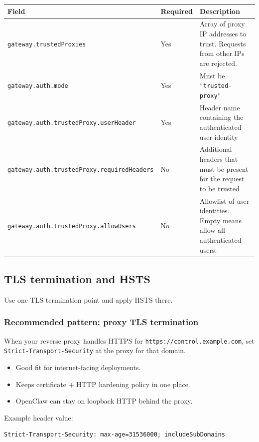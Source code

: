 \begin{table}[h]
\centering
\small
\begin{tabular}{|l|l|l|}
\hline
Field & Required & Description \\
\hline
\texttt{gateway.trustedProxies} & Yes & Array of proxy IP addresses to trust. Requests from other IPs are rejected. \\
\hline
\texttt{gateway.auth.mode} & Yes & Must be \texttt{"trusted-proxy"} \\
\hline
\texttt{gateway.auth.trustedProxy.userHeader} & Yes & Header name containing the authenticated user identity \\
\hline
\texttt{gateway.auth.trustedProxy.requiredHeaders} & No & Additional headers that must be present for the request to be trusted \\
\hline
\texttt{gateway.auth.trustedProxy.allowUsers} & No & Allowlist of user identities. Empty means allow all authenticated users. \\
\hline
\end{tabular}
\end{table}



\subsection{TLS termination and HSTS}


Use one TLS termination point and apply HSTS there.

\subsubsection{Recommended pattern: proxy TLS termination}


When your reverse proxy handles HTTPS for \texttt{https://control.example.com}, set
\texttt{Strict-Transport-Security} at the proxy for that domain.

\begin{itemize}
  \item Good fit for internet-facing deployments.
  \item Keeps certificate + HTTP hardening policy in one place.
  \item OpenClaw can stay on loopback HTTP behind the proxy.
\end{itemize}


Example header value:

\begin{lstlisting}
Strict-Transport-Security: max-age=31536000; includeSubDomains
\end{lstlisting}



